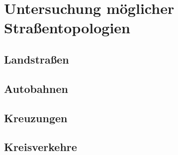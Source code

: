 
\chapter{Untersuchung möglicher Straßentopologien}
\label{cha:street_topologies}



\section{Landstraßen}




\section{Autobahnen}




\section{Kreuzungen}


\section{Kreisverkehre}

